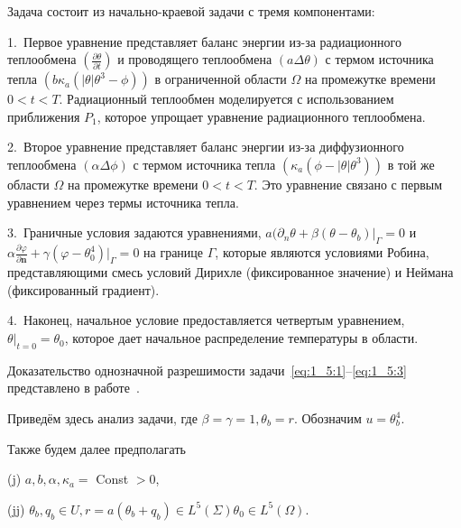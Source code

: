 Задача состоит из начально-краевой задачи с тремя компонентами:


1.\ Первое уравнение представляет баланс энергии из-за радиационного
теплообмена $\left(\frac{\partial \theta}{\partial t}\right)$ и проводящего
теплообмена $(a \Delta \theta)$ с термом источника тепла
$\left(b \kappa_a \left(|\theta| \theta^3 - \phi \right)\right)$
в ограниченной области $\Omega$ на промежутке времени $0 < t < T$.
Радиационный теплообмен моделируется с использованием приближения $P_1$,
которое упрощает уравнение радиационного теплообмена.

2.\ Второе уравнение представляет баланс энергии из-за диффузионного
теплообмена $(\alpha \Delta \phi)$ с термом источника тепла
$\left(\kappa_a \left(\phi - |\theta| \theta^3 \right)\right)$
в той же области $\Omega$ на промежутке времени $0 < t < T$.
Это уравнение связано с первым уравнением через термы источника тепла.

3.\ Граничные условия задаются уравнениями,
$a(\partial_n \theta +\left.\beta\left(\theta-\theta_{b}\right)\right|_{\Gamma}=0$
и $\alpha \frac{\partial \varphi}{\partial \mathbf{n}}
+ \gamma (\varphi-\theta_0^4)|_{\Gamma} = 0$
на границе $\Gamma$, которые являются условиями Робина,
представляющими смесь условий Дирихле
(фиксированное значение) и Неймана (фиксированный градиент).

4.\ Наконец, начальное условие предоставляется четвертым уравнением,
$\theta|_{t=0} = \theta_0$, которое дает начальное
распределение температуры в области.


%

Доказательство однозначной разрешимости задачи~\eqref{eq:1_5:1}--\eqref{eq:1_5:3}
представлено в работе~\cite{JMAA-19}.

Приведём здесь анализ задачи, где $\beta=\gamma=1, \theta_b = r$.
Обозначим $ u = \theta_b^4$.

Также будем далее предполагать

(j) $a, b, \alpha, \kappa_{a} =$ Const $>0$,

(jj) $\theta_{b}, q_{b} \in U, r
=a\left(\theta_{b}+q_{b}\right) \in L^{5}(\Sigma) \theta_{0} \in L^{5}(\Omega)$.


